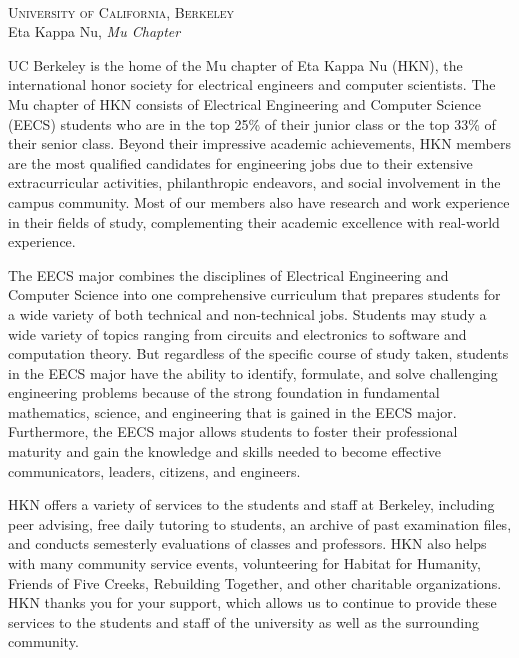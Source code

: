 \documentclass[11pt]{article}
\begin{document}
\\[-1.7em]
\textsc{\large\color{white} University of California, Berkeley}\\[1.2em]
\hspace{-20pt}\textnormal{\large\color{bg} Eta Kappa Nu, {\em Mu Chapter}}


UC Berkeley is the home of the Mu chapter of Eta Kappa Nu (HKN), the international honor society for
electrical engineers and computer scientists. The Mu chapter of HKN consists of Electrical Engineering and
Computer Science (EECS) students who are in the top 25\% of their junior class or the top 33\% of their senior
class. Beyond their impressive academic achievements, HKN members are the most qualified candidates for
engineering jobs due to their extensive extracurricular activities, philanthropic endeavors, and social
involvement in the campus community. Most of our members also have research and work experience in their
fields of study, complementing their academic excellence with real-world experience.

The EECS major combines the disciplines of Electrical Engineering and Computer Science into one
comprehensive curriculum that prepares students for a wide variety of both technical and non-technical jobs.
Students may study a wide variety of topics ranging from circuits and electronics to software and computation
theory. But regardless of the specific course of study taken, students in the EECS major have the ability to
identify, formulate, and solve challenging engineering problems because of the strong foundation in
fundamental mathematics, science, and engineering that is gained in the EECS major. Furthermore, the EECS
major allows students to foster their professional maturity and gain the knowledge and skills needed to
become effective communicators, leaders, citizens, and engineers.

HKN offers a variety of services to the students and staff at Berkeley, including peer advising, free daily
tutoring to students, an archive of past examination files, and conducts semesterly evaluations of classes and
professors. HKN also helps with many community service events, volunteering for Habitat for Humanity,
Friends of Five Creeks, Rebuilding Together, and other charitable organizations. HKN thanks you for your
support, which allows us to continue to provide these services to the students and staff of the university as
well as the surrounding community.
\end{document}
